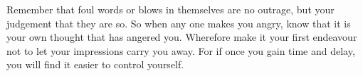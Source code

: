 Remember  that foul  words or  blows  in themselves  are no  outrage, but  your
judgement that they  are so. So when any  one makes you angry, know  that it is
your own thought  that has angered you. Wherefore make  it your first endeavour
not to  let your  impressions carry  you away. For  if once  you gain  time and
delay, you will find it easier to control yourself.
